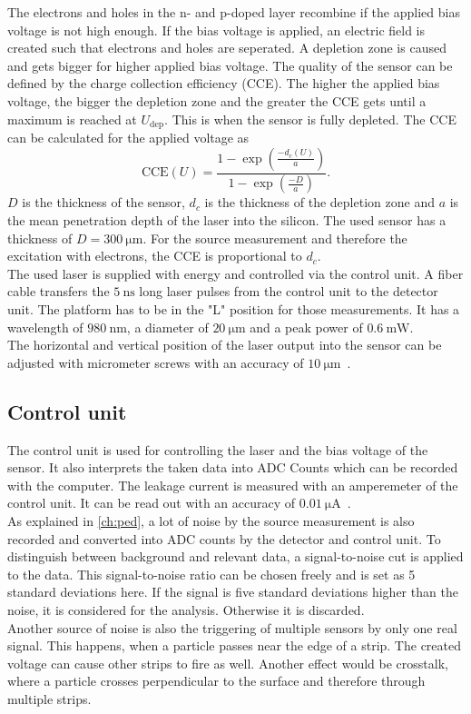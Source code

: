 The electrons and holes in the n- and p-doped layer recombine if the applied bias voltage is not high enough. If the
bias voltage is applied, an electric field is created such that electrons and holes are seperated. A depletion zone
is caused and gets bigger for higher applied bias voltage. The quality of the sensor can be defined by the charge
collection efficiency (CCE). The higher the applied bias voltage, the bigger the depletion zone and the greater
the CCE gets until a maximum is reached at $U_{\mathrm{dep}}$. This is when the sensor is fully depleted. The CCE can be 
calculated for the applied voltage as
\begin{equation}
    \text{CCE}(U) = \frac{1-\exp{(\frac{-d_c(U)}{a})}}{1-\exp{(\frac{-D}{a})}}.
    \label{eq:CCE}
\end{equation}
$D$ is the thickness of the sensor, $d_c$ is the thickness of the depletion zone and $a$ is the mean penetration depth of
the laser into the silicon. The used sensor has a thickness of $D = \qty{300}{\micro\metre}$. For the source measurement and
therefore the excitation with electrons, the CCE is proportional to $d_c$.\\
The used laser is supplied with energy and controlled via the control unit. A fiber cable transfers the $\qty{5}{\nano\second}$ long laser pulses from
the control unit to the detector unit. The platform has to be in the "L" position for those measurements. It has a 
wavelength of $\qty{980}{\nano\metre}$, a diameter of $\qty{20}{\micro\metre}$ and a peak power of $\qty{0.6}{\milli\watt}$.\\
The horizontal and vertical position of the laser output into the sensor can be adjusted with micrometer screws with an accuracy
of $\qty{10}{\micro\metre}$~\cite{SiliconStrip}.

\subsection{Control unit}

The control unit is used for controlling the laser and the bias voltage of the sensor. It also interprets the taken
data into ADC Counts which can be recorded with the computer. The leakage current is measured with an amperemeter of
the control unit. It can be read out with an accuracy of $\qty{0.01}{\micro\ampere}$~\cite{SiliconStrip}.\\
As explained in \autoref{ch:ped}, a lot of noise by the source measurement is also recorded and converted into ADC counts by the detector and control unit.
To distinguish between background and relevant data, a signal-to-noise cut is applied to the data. This signal-to-noise ratio 
can be chosen freely and is set as 5 standard deviations here. If the signal is five standard deviations higher than the noise, it is considered for the analysis.
Otherwise it is discarded.\\
Another source of noise is also the triggering of multiple sensors by only one real signal. This happens, when
a particle passes near the edge of a strip. The created voltage can cause other strips to fire as well. Another effect
would be crosstalk, where a particle crosses perpendicular to the surface and therefore through multiple strips.

